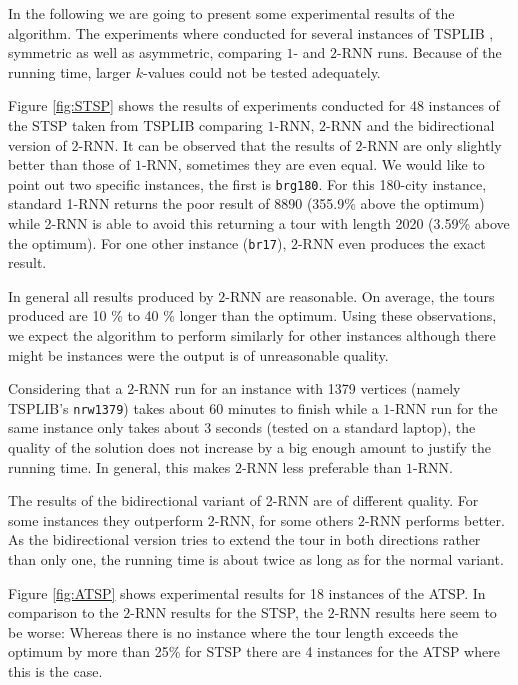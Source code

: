 In the following we are going to present some experimental results of the algorithm. The experiments where conducted for several instances of TSPLIB \cite{REINELT1995}, symmetric as well as asymmetric, comparing $1$- and $2$-RNN runs.
Because of the running time, larger $k$-values could not be tested adequately.



Figure \ref{fig:STSP} shows the results of experiments conducted for 48 instances of the STSP taken from TSPLIB \cite{REINELT1995} comparing $1$-RNN, $2$-RNN and the bidirectional version of $2$-RNN.
It can be observed that the results of $2$-RNN are only slightly better than those of $1$-RNN, sometimes they are even equal.
We would like to point out two specific instances, the first is \texttt{brg180}.
For this 180-city instance, standard 1-RNN returns the poor result of 8890 (355.9\% above the optimum) while 2-RNN is able to avoid this returning a tour with length 2020 (3.59\% above the optimum).
For one other instance (\texttt{br17}), $2$-RNN even produces the exact result.

In general all results produced by $2$-RNN are reasonable. 
On average, the tours produced are 10 \% to 40 \% longer than the optimum.
Using these observations, we expect the algorithm to perform similarly for other instances although there might be instances were the output is of unreasonable quality.

Considering that a $2$-RNN run for an instance with 1379 vertices (namely TSPLIB's \texttt{nrw1379}) takes about 60 minutes to finish while a $1$-RNN run for the same instance only takes about 3 seconds (tested on a standard laptop), the quality of the solution does not increase by a big enough amount to justify the running time.
In general, this makes $2$-RNN less preferable than $1$-RNN.

The results of the bidirectional variant of 2-RNN are of different quality. For some instances they outperform $2$-RNN, for some others $2$-RNN performs better.
As the bidirectional version tries to extend the tour in both directions rather than only one, the running time is about twice as long as for the normal variant.



Figure \ref{fig:ATSP} shows experimental results for 18 instances of the ATSP.
In comparison to the $2$-RNN results for the STSP, the $2$-RNN results here seem to be worse:
Whereas there is no instance where the tour length exceeds the optimum by more than 25\% for STSP there are 4 instances for the ATSP where this is the case.
